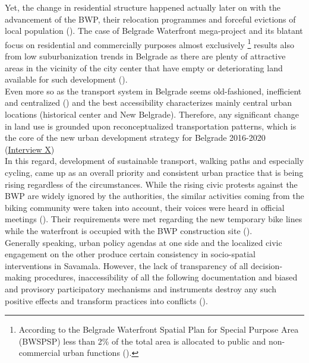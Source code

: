 \documentclass[11pt]{report}
\begin{document}
Yet, the change in residential structure happened actually later on with the advancement of the BWP, their relocation programmes and forceful evictions of local population (\cite{ref media}).
The case of Belgrade Waterfront mega-project and its blatant focus on residential and commercially purposes almost exclusively
\footnote{According to the Belgrade Waterfront Spatial Plan for Special Purpose Area (BWSPSP) less than 2\% of the total area is allocated to public and non-commercial urban functions (\cite{BWPSPSP}).}
results also from low suburbanization trends in Belgrade as there are plenty of attractive areas in the vicinity of the city center that have empty or deteriorating land available for such development (\citealt{hirt_belgrade_2009}).
\\

Even more so as the transport system in Belgrade seems old-fashioned, inefficient and centralized (\citealt{grozdanic_belgrade_2008}) and the best accessibility characterizes mainly central urban locations (historical center and New Belgrade).
Therefore, any significant change in land use is grounded upon reconceptualized transportation patterns, which is the core of the new urban development strategy for Belgrade 2016-2020 (\href{InterviewX}{Interview X})
\\

In this regard, development of sustainable transport, walking paths and especially cycling, came up as an overall priority and consistent urban practice that is being rising regardless of the circumstances.
While the rising civic protests against the BWP are widely ignored by the authorities, the similar activities coming from the biking community were taken into account, their voices were heard in official meetings (\cite{media}).
Their requirements were met regarding the new temporary bike lines while the waterfront is occupied with the BWP construction site (\cite{media}).
\\

Generally speaking, urban policy agendas at one side and the localized civic engagement on the other produce certain consistency in socio-spatial interventions in Savamala.
However, the lack of transparency of all decision-making procedures, inaccessibility of all the following documentation and biased and provisory participatory mechanisms and instruments destroy any such positive effects and transform practices into conflicts (\cite{MinistarstvoProstora2014}).
\end{document}
